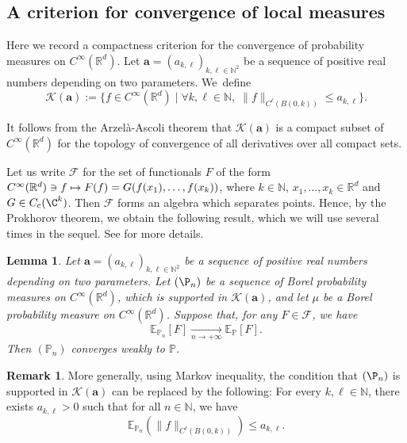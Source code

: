 \documentclass[JEP,XML,SOM,Unicode,published]{cedram}
\let\mathcal\mathscr
\newcommand\mto{\mathchoice{\longmapsto}{\mapsto}{\mapsto}{\mapsto}}
\let\sep\mid
\newcommand{\rc}{\mathrm{c}}
\theoremstyle{plain}
\newtheorem{lemma}[theorem]{Lemma}
\theoremstyle{definition}
\newtheorem{remark}[theorem]{Remark}
\newcommand{\N}{\mathbb{N}}
\newcommand{\R}{\mathbb{R}}
\begin{document}
\subsection{A criterion for convergence of local measures}\label{ss:criterion}
Here we record a compactness criterion for the convergence of probability measures on $C^\infty(\R^d)$. Let $\boldsymbol{a} = (a_{k,\ell})_{k,\ell \in \N^2}$ be a sequence of positive real numbers depending on two parameters. We~define
\begin{equation}\label{eq:CompSet}
\mathcal{K}(\boldsymbol{a}):= \{f\in C^\infty(\R^d) \sep\forall k, \ell \in \N,\; \|f\|_{C^\ell (B(0,k))} \leq a_{k,\ell}\}.
\end{equation}

It follows from the Arzelà-Ascoli theorem that $\mathcal{K}(\boldsymbol{a})$ is a compact subset of $C^\infty(\R^d)$ for the topology of convergence of all derivatives over all compact sets.

Let us write $\mathcal{F}$ for the set of functionals $F$ of the form
$C^\infty(\R^d)\ni f\mto F(f) = G(f(x_1),\dots, f(x_k))$,
where $k\in \N$, $x_1,\dots, x_k\in \R^d$ and $G\in C_\rc(\C^k)$.
Then $\mathcal{F}$ forms an algebra which separates points. Hence, by the Prokhorov theorem, we obtain the following result, which we will use several times in the sequel. See \cite[\S3]{LWL} for more details.

\begin{lemma}\label{lem:CritMes}
Let $\boldsymbol{a} = (a_{k,\ell})_{k,\ell \in \N^2}$ be a sequence of positive real numbers depending on two parameters. Let $(\P_n)$ be a sequence of Borel probability measures on $C^\infty(\R^d)$, which is supported in $\mathcal{K}(\boldsymbol{a})$, and let $\mu$ be a Borel probability measure on $C^\infty(\R^d)$. Suppose that, for any $F\in \mathcal{F}$, we have
\[
\mathbb{E}_{\mathbb{P}_n}[F] \underset{n\to +\infty}{\to} \mathbb{E}_{\mathbb{P}}[F].
\]
Then $(\mathbb{P}_n)$ converges weakly to $\mathbb{P}$.
\end{lemma}

\begin{remark}\label{rem:CondEsperance}
More generally, using Markov inequality, the condition that $(\P_n)$ is supported in $\mathcal{K}(\boldsymbol{a})$ can be replaced by the following:
For every $k, \ell\in \N$, there exists $a_{k,\ell}>0$ such that for all $n\in \N$, we have
\[
\mathbb{E}_{\mathbb{P}_n} \left(\| f\|_{C^\ell (B(0,k))} \right)\leq a_{k,\ell}.
\]
\end{remark}
\end{document}
